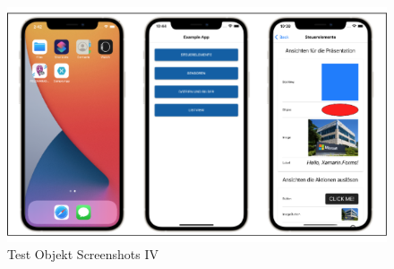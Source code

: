 \begin{figure}[!ht]
 \includegraphics[width=\textwidth,keepaspectratio]{Images/Screenshot/AppIconAndMenu.png}
 \caption[]{Test Objekt Screenshots IV}
\end{figure}


